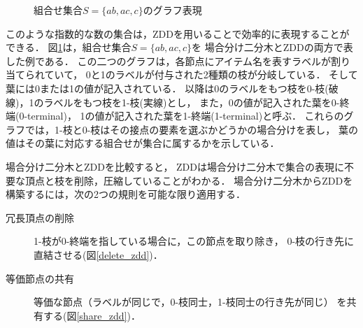 \begin{figure}[htbp]
\begin{minipage}[b]{0.48\hsize}
    \label{zdd_graph}
  \end{minipage}
  \caption{組合せ集合$S=\{ab,ac,c\}$のグラフ表現}\label{combined_set}
\end{figure}

このような指数的な数の集合は，ZDDを用いることで効率的に表現することができる．
図\ref{combined_set}は，組合せ集合$S=\{ab,ac,c\}$を
場合分け二分木とZDDの両方で表した例である．
この二つのグラフは，各節点にアイテム名を表すラベルが割り当てられていて，
0と1のラベルが付与された2種類の枝が分岐している．
そして葉には0または1の値が記入されている．
以降は0のラベルをもつ枝を0-枝(破線)，1のラベルをもつ枝を1-枝(実線)とし，
また，0の値が記入された葉を0-終端(0-terminal)，
1の値が記入された葉を1-終端(1-terminal)と呼ぶ．
これらのグラフでは，1-枝と0-枝はその接点の要素を選ぶかどうかの場合分けを表し，
葉の値はその葉に対応する組合せが集合に属するかを示している．

場合分け二分木とZDDを比較すると，
ZDDは場合分け二分木で集合の表現に不要な頂点と枝を削除，圧縮していることがわかる．
場合分け二分木からZDDを構築するには，次の2つの規則を可能な限り適用する．

\begin{description}
  \item[冗長頂点の削除] 1-枝が0-終端を指している場合に，この節点を取り除き，
  0-枝の行き先に直結させる(図\ref{delete_zdd})．
  \item[等価節点の共有] 等価な節点（ラベルが同じで，0-枝同士，1-枝同士の行き先が同じ）
  を共有する(図\ref{share_zdd})．
\end{description}

